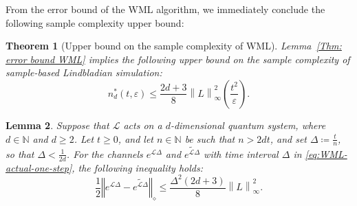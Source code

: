\documentclass[superscriptaddress,amsmath,amssymb,aps,pra,letterpaper,tightenlines,notitlepages,12pt]{revtex4-2}
\newtheorem{theorem}{Theorem}
\newtheorem{lemma}[theorem]{Lemma}
\begin{document}
\medskip

From the error bound of the WML algorithm, we immediately conclude the following sample complexity upper bound:

\begin{theorem}[Upper bound on the sample complexity of WML]
\label{cor:samp-comp-upper-bnd-WML}
Lemma~\ref{Thm: error bound WML} implies  the following upper bound on the sample complexity of sample-based Lindbladian simulation:
\begin{equation}\label{eq:WML-sample-bound}
    n^{\ast}_d(t,\varepsilon) \leq  \frac{2d+3}{8} \left\|L\right\|_\infty^2 \left( \frac{t^2}{\varepsilon} \right).
\end{equation}
\end{theorem}



\begin{lemma}
\label{lem:single-step-WML-bound}
Suppose that $\mathcal{L}$ acts on a $d$-dimensional quantum system, where $d\in\mathbb{N}$ and $d\geq 2$. Let $t\geq0$, and let $n\in\mathbb{N}$ be such that
$n>2dt$, and set $\Delta\coloneqq\frac{t}{n}$, so that $\Delta<\frac{1}{2d}$.
For the channels $e^{\mathcal{L}\Delta}$ and $\widetilde{e^{\mathcal{L}\Delta
}}$ with time interval $\Delta$ in
\eqref{eq:WML-actual-one-step}, the following inequality holds:
    \begin{equation}
        \frac{1}{2}\left\Vert e^{\mathcal{L}\Delta}-\widetilde{e^{\mathcal{L}\Delta}}\right\Vert
        _{\diamond}\leq\frac{\Delta^2(2d+3)}{8} \left\|L\right\|_\infty^2 .
    \end{equation}
\end{lemma}
\end{document}
